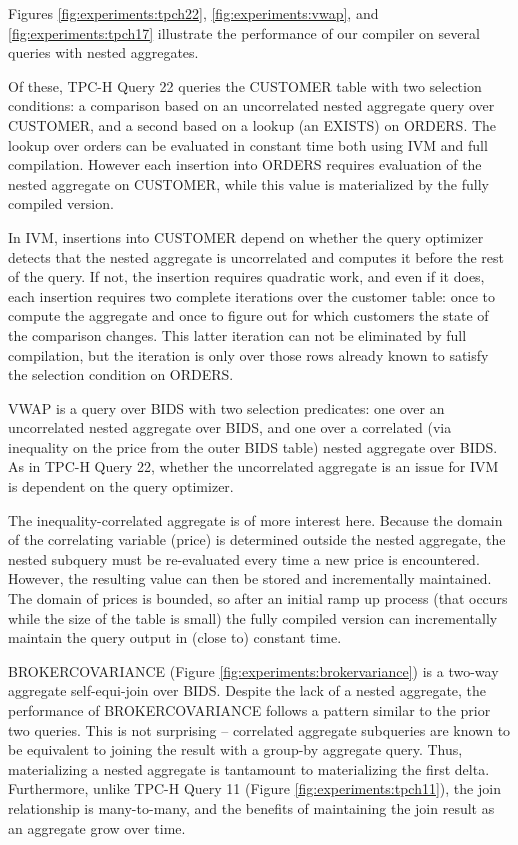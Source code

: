 Figures \ref{fig:experiments:tpch22}, \ref{fig:experiments:vwap}, and \ref{fig:experiments:tpch17} illustrate the performance of our compiler on several queries with nested aggregates.

Of these, TPC-H Query 22 queries the CUSTOMER table with two selection conditions: a comparison based on an uncorrelated nested aggregate query over CUSTOMER, and a second based on a lookup (an EXISTS) on ORDERS.  The lookup over orders can be evaluated in constant time both using IVM and full compilation.  However each insertion into ORDERS requires evaluation of the nested aggregate on CUSTOMER, while this value is materialized by the fully compiled version.  

In IVM, insertions into CUSTOMER depend on whether the query optimizer detects that the nested aggregate is uncorrelated and computes it before the rest of the query.  If not, the insertion requires quadratic work, and even if it does, each insertion requires two complete iterations over the customer table: once to compute the aggregate and once to figure out for which customers the state of the comparison changes.  This latter iteration can not be eliminated by full compilation, but the iteration is only over those rows already known to satisfy the selection condition on ORDERS.

VWAP is a query over BIDS with two selection predicates: one over an uncorrelated nested aggregate over BIDS, and one over a correlated (via inequality on the price from the outer BIDS table) nested aggregate over BIDS.  As in TPC-H Query 22, whether the uncorrelated aggregate is an issue for IVM is dependent on the query optimizer.  

The inequality-correlated aggregate is of more interest here.  Because the domain of the correlating variable (price) is determined outside the nested aggregate, the nested subquery must be re-evaluated every time a new price is encountered.  However, the resulting value can then be stored and incrementally maintained.  The domain of prices is bounded, so after an initial ramp up process (that occurs while the size of the table is small) the fully compiled version can incrementally maintain the query output in (close to) constant time.

BROKERCOVARIANCE (Figure \ref{fig:experiments:brokervariance}) is a two-way aggregate self-equi-join over BIDS.  Despite the lack of a nested aggregate, the performance of BROKERCOVARIANCE follows a pattern similar to the prior two queries.  This is not surprising -- correlated aggregate subqueries are known to be equivalent to joining the result with a group-by aggregate query.  Thus, materializing a nested aggregate is tantamount to materializing the first delta.  Furthermore, unlike TPC-H Query 11 (Figure \ref{fig:experiments:tpch11}), the join relationship is many-to-many, and the benefits of maintaining the join result as an aggregate grow over time.

